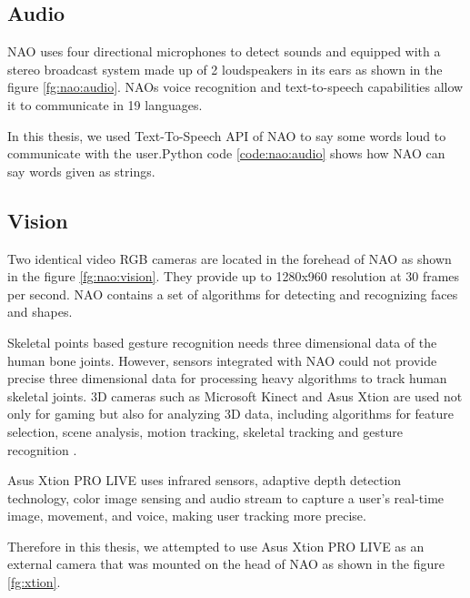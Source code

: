  \label{code:nao:motion}

\subsection{Audio} NAO uses four directional microphones to detect sounds and equipped with a stereo broadcast system made up of 2 loudspeakers in its ears as shown in the figure \ref{fg:nao:audio}. NAOs voice recognition and text-to-speech capabilities allow it to communicate in 19 languages. 

 

In this thesis, we used Text-To-Speech API of NAO to say some words loud to communicate with the user.Python code \ref{code:nao:audio} shows  how NAO can say words given as strings.

 \label{code:nao:audio}

\subsection{Vision} Two identical video RGB cameras are located in the forehead of NAO as shown in the figure \ref{fg:nao:vision}. They provide up to 1280x960 resolution at 30 frames per second. NAO contains a set of algorithms for detecting and recognizing faces and shapes.



Skeletal points based gesture recognition needs three dimensional data of the human bone joints. However, sensors integrated with NAO could not provide precise three dimensional data for processing heavy algorithms to track human skeletal joints. 3D cameras such as Microsoft Kinect and Asus Xtion are used not only for gaming but also for analyzing 3D data, including algorithms for feature selection, scene analysis, motion tracking, skeletal tracking and gesture recognition \cite{12}. 

Asus Xtion PRO LIVE uses infrared sensors, adaptive depth detection technology, color image sensing and audio stream to capture a user's real-time image, movement, and voice, making user tracking more precise. 



Therefore in this thesis, we attempted to use Asus Xtion PRO LIVE as an external camera that was mounted on the head of NAO as shown in the figure \ref{fg:xtion}. 

